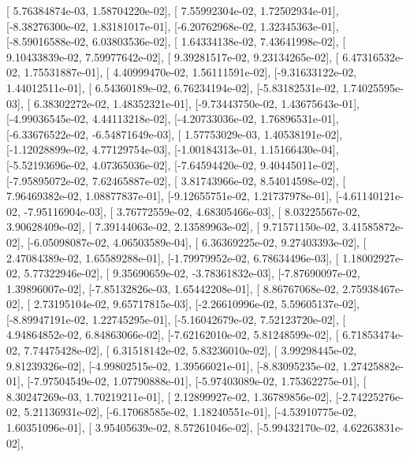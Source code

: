 \documentclass{article}
\begin{document}
       [ 5.76384874e-03,  1.58704220e-02],
       [ 7.55992304e-02,  1.72502934e-01],
       [-8.38276300e-02,  1.83181017e-01],
       [-6.20762968e-02,  1.32345363e-01],
       [-8.59016588e-02,  6.03803536e-02],
       [ 1.64334138e-02,  7.43641998e-02],
       [ 9.10433839e-02,  7.59977642e-02],
       [ 9.39281517e-02,  9.23134265e-02],
       [ 6.47316532e-02,  1.75531887e-01],
       [ 4.40999470e-02,  1.56111591e-02],
       [-9.31633122e-02,  1.44012511e-01],
       [ 6.54360189e-02,  6.76234194e-02],
       [-5.83182531e-02,  1.74025595e-03],
       [ 6.38302272e-02,  1.48352321e-01],
       [-9.73443750e-02,  1.43675643e-01],
       [-4.99036545e-02,  4.44113218e-02],
       [-4.20733036e-02,  1.76896531e-01],
       [-6.33676522e-02, -6.54871649e-03],
       [ 1.57753029e-03,  1.40538191e-02],
       [-1.12028899e-02,  4.77129754e-03],
       [-1.00184313e-01,  1.15166430e-04],
       [-5.52193696e-02,  4.07365036e-02],
       [-7.64594420e-02,  9.40445011e-02],
       [-7.95895072e-02,  7.62465887e-02],
       [ 3.81743966e-02,  8.54014598e-02],
       [ 7.96469382e-02,  1.08877837e-01],
       [-9.12655751e-02,  1.21737978e-01],
       [-4.61140121e-02, -7.95116904e-03],
       [ 3.76772559e-02,  4.68305466e-03],
       [ 8.03225567e-02,  3.90628409e-02],
       [ 7.39144063e-02,  2.13589963e-02],
       [ 9.71571150e-02,  3.41585872e-02],
       [-6.05098087e-02,  4.06503589e-04],
       [ 6.36369225e-02,  9.27403393e-02],
       [ 2.47084389e-02,  1.65589288e-01],
       [-1.79979952e-02,  6.78634496e-03],
       [ 1.18002927e-02,  5.77322946e-02],
       [ 9.35690659e-02, -3.78361832e-03],
       [-7.87690097e-02,  1.39896007e-02],
       [-7.85132826e-03,  1.65442208e-01],
       [ 8.86767068e-02,  2.75938467e-02],
       [ 2.73195104e-02,  9.65717815e-03],
       [-2.26610996e-02,  5.59605137e-02],
       [-8.89947191e-02,  1.22745295e-01],
       [-5.16042679e-02,  7.52123720e-02],
       [ 4.94864852e-02,  6.84863066e-02],
       [-7.62162010e-02,  5.81248599e-02],
       [ 6.71853474e-02,  7.74475428e-02],
       [ 6.31518142e-02,  5.83236010e-02],
       [ 3.99298445e-02,  9.81239326e-02],
       [-4.99802515e-02,  1.39566021e-01],
       [-8.83095235e-02,  1.27425882e-01],
       [-7.97504549e-02,  1.07790888e-01],
       [-5.97403089e-02,  1.75362275e-01],
       [ 8.30247269e-03,  1.70219211e-01],
       [ 2.12899927e-02,  1.36789856e-02],
       [-2.74225276e-02,  5.21136931e-02],
       [-6.17068585e-02,  1.18240551e-01],
       [-4.53910775e-02,  1.60351096e-01],
       [ 3.95405639e-02,  8.57261046e-02],
       [-5.99432170e-02,  4.62263831e-02],
\end{document}
